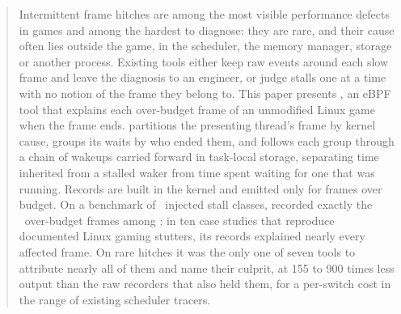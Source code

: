 \begin{abstract}
Intermittent frame hitches are among the most visible performance defects in
games and among the hardest to diagnose: they are rare, and their cause often
lies outside the game, in the scheduler, the memory manager, storage or
another process. Existing tools either keep raw events around each slow
frame and leave the diagnosis to an engineer, or judge stalls one at a time
with no notion of the frame they belong to. This paper presents \sys, an
eBPF tool that explains each over-budget frame of an unmodified Linux game
when the frame ends. \sys partitions the presenting thread's frame by kernel
cause, groups its waits by who ended them, and follows each group through a
chain of wakeups carried forward in task-local storage, separating time
inherited from a stalled waker from time spent waiting for one that was
running. Records are built in the kernel and emitted only for frames over
budget. On a benchmark of \hbnClasses\ injected stall classes, \sys recorded
exactly the \hbtotOver\ over-budget frames among \hbtotFrames; in ten case
studies that reproduce documented Linux gaming stutters, its records
explained nearly every affected frame. On rare hitches it was the only one
of seven tools to attribute nearly all of them and name their culprit, at
155 to 900 times less output than the raw recorders that also held them,
for a per-switch cost in the range of existing scheduler tracers.
\end{abstract}
